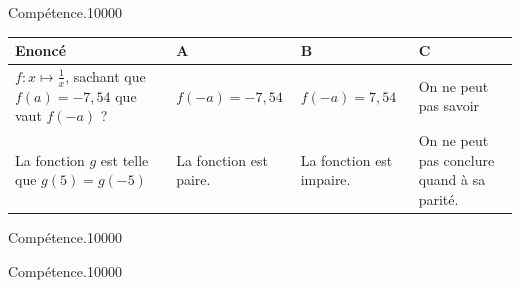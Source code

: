 
\begin{pageAuto} %

\begin{ExoAutoN}{Compétence.}{1}{0}{0}{0}{0}
\vspace{.2cm}
\begin{tabular}{|M{.4\linewidth}|M{.18\linewidth}|M{.18\linewidth}|M{.18\linewidth}|}
\hline
Enoncé & A & B & C \\\hline
$f:x\mapsto \frac{1}{x}$, sachant que $f(a)=-7,54$ que vaut $f(-a)$ ? & $f(-a)=-7,54$ & $f(-a)=7,54$ & On ne peut pas savoir \\\hline
La fonction $g$ est telle que $g(5)=g(-5)$ & La fonction est paire. & La fonction est impaire. & On ne peut pas conclure quand à sa parité. \\\hline
\end{tabular}
\end{ExoAutoN}

\end{pageAuto} %


\begin{pageAlgo} %

\begin{ExoAlgoN}{Compétence.}{1}{0}{0}{0}{0}

\end{ExoAlgoN}

\begin{ExoAlgo}{Compétence.}{1}{0}{0}{0}{0}

\end{ExoAlgo}

\end{pageAlgo} %


\begin{pageBrouillon}

\end{pageBrouillon}


